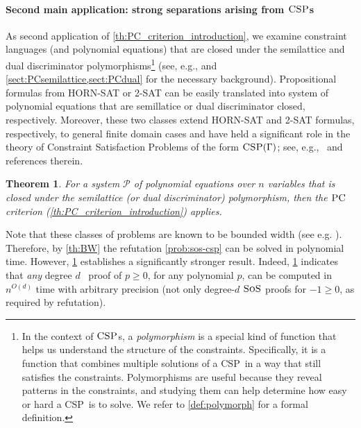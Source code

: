 \documentclass[11pt]{article}
\newcommand{\sos}{\text{\sc{SoS}}}
\newcommand{\CSP}{\textsc{CSP}}
\newcommand{\PC}{\textsc{PC}}
\newcommand{\1}{\textbf{1}}
\newtheorem{theorem}{Theorem}[section]
\begin{document}
\paragraph{Second main application: strong separations arising from $\CSP$s}\label{sec:separation-intro}
%
As second application of \cref{th:PC_criterion_introduction}, we examine constraint languages (and polynomial equations) that are closed under the semilattice and dual discriminator polymorphisms\footnote{In the context of $\CSP$s, a \emph{polymorphism} is a special kind of function that helps us understand the structure of the constraints. Specifically, it is a function that combines multiple solutions of a \CSP\ in a way that still satisfies the constraints. Polymorphisms are useful because they reveal patterns in the constraints, and studying them can help determine how easy or hard a \CSP\ is to solve. We refer to \cref{def:polymorph} for a formal definition.} (see, e.g., \cite{barto_et_al:DFU:2017:6959} and \cref{sect:PCsemilattice,sect:PCdual} for the necessary background). 
Propositional formulas from \textsc{HORN-SAT} or \textsc{2-SAT} can be easily translated into system of polynomial equations that are semillatice or dual discriminator closed, respectively.
%
Moreover, these two classes extend \textsc{HORN-SAT} and \textsc{2-SAT} formulas, respectively, to general finite domain cases and have held a significant role in the theory of Constraint Satisfaction Problems of the form $\CSP(\Gamma)$; see, e.g.,~\cite{barto_et_al:DFU:2017:6959,2017dfu7} and references therein.

\begin{theorem}\label{th:semilattice+dualdiscr}
    For a system $\mathcal{P}$ of polynomial equations over $n$ variables that is closed under the semilattice (or dual discriminator) polymorphism, then the $\PC$ criterion (\cref{th:PC_criterion_introduction}) applies.
\end{theorem}
%
Note that these classes of problems are known to be bounded width (see e.g. \cite{barto_et_al:DFU:2017:6959}). Therefore, by \cref{th:BW} the refutation \cref{prob:sos-csp} can be solved in polynomial time.
However, \cref{th:semilattice+dualdiscr} establishes a significantly stronger result.
Indeed, \cref{th:semilattice+dualdiscr} indicates that \emph{any} degree \( d \) \sos\ proof of $p\geq 0$, for any polynomial $p$, can be computed in \( n^{O(d)} \) time with arbitrary precision (not only degree-$d$ $\sos$ proofs for $-1\geq 0$, as required by refutation). %
\end{document}

